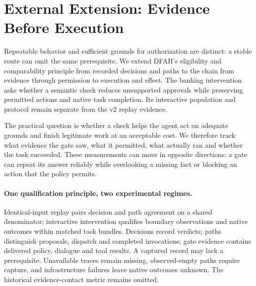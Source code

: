 \section{External Extension: Evidence Before Execution}
\label{sec:tau-extension}

Repeatable behavior and sufficient grounds for authorization are distinct:
a stable route can omit the same prerequisite. We extend DFAH's eligibility
and comparability principle from recorded decisions and paths to the chain
from evidence through permission to execution and effect. The banking
intervention asks whether a semantic check reduces unsupported approvals while
preserving permitted actions and native task completion. Its interactive
population and protocol remain separate from the v2 replay evidence.

The practical question is whether a check helps the agent act on adequate
grounds and finish legitimate work at an acceptable cost. We therefore track
what evidence the gate saw, what it permitted, what actually ran and whether
the task succeeded. These measurements can move in opposite directions:
a gate can repeat its answer reliably while overlooking a missing fact or
blocking an action that the policy permits.

\paragraph{One qualification principle, two experimental regimes.}
Identical-input replay pairs decision and path agreement on a shared
denominator; interactive intervention qualifies boundary observations and
native outcomes within matched task bundles. Decisions record verdicts;
paths distinguish proposals, dispatch and completed invocations; gate evidence
contains delivered policy, dialogue and tool results. A captured record may
lack a prerequisite. Unavailable traces remain missing, observed-empty paths
require capture, and infrastructure failures leave native outcomes unknown.
The historical evidence-contact metric remains omitted.

